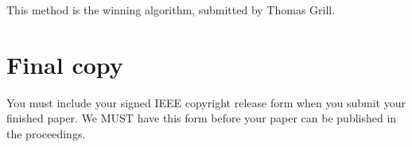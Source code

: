 \documentclass[10pt,twocolumn,letterpaper]{article}
\begin{document}
This method is the winning algorithm, submitted by Thomas Grill.

\section{Final copy}

You must include your signed IEEE copyright release form when you submit
your finished paper. We MUST have this form before your paper can be
published in the proceedings.


{\small   }
\end{document}
